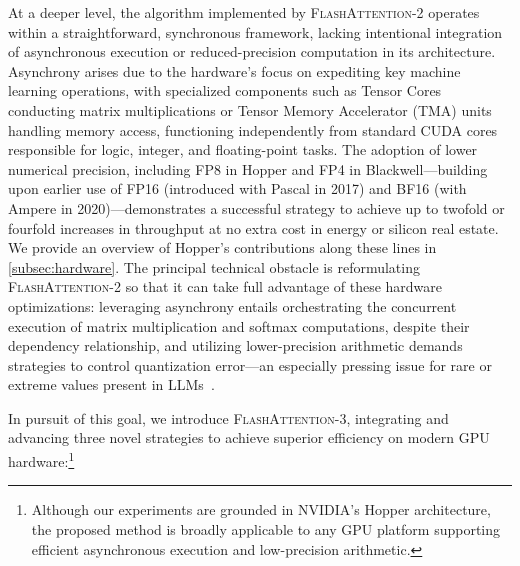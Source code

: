 At a deeper level, the algorithm implemented by \textsc{FlashAttention-2} operates within a straightforward, synchronous framework, lacking intentional integration of asynchronous execution or reduced-precision computation in its architecture. Asynchrony arises due to the hardware’s focus on expediting key machine learning operations, with specialized components such as Tensor Cores conducting matrix multiplications or Tensor Memory Accelerator (TMA) units handling memory access, functioning independently from standard CUDA cores responsible for logic, integer, and floating-point tasks. The adoption of lower numerical precision, including FP8 in Hopper and FP4 in Blackwell—building upon earlier use of FP16 (introduced with Pascal in 2017) and BF16 (with Ampere in 2020)—demonstrates a successful strategy to achieve up to twofold or fourfold increases in throughput at no extra cost in energy or silicon real estate. We provide an overview of Hopper’s contributions along these lines in \cref{subsec:hardware}. The principal technical obstacle is reformulating \textsc{FlashAttention-2} so that it can take full advantage of these hardware optimizations: leveraging asynchrony entails orchestrating the concurrent execution of matrix multiplication and softmax computations, despite their dependency relationship, and utilizing lower-precision arithmetic demands strategies to control quantization error—an especially pressing issue for rare or extreme values present in LLMs~\citep{dettmers2208llm, sun2024massive}.

In pursuit of this goal, we introduce \textsc{FlashAttention-3}, integrating and advancing three novel strategies to achieve superior efficiency on modern GPU hardware:\footnote{Although our experiments are grounded in NVIDIA’s Hopper architecture, the proposed method is broadly applicable to any GPU platform supporting efficient asynchronous execution and low-precision arithmetic.}

